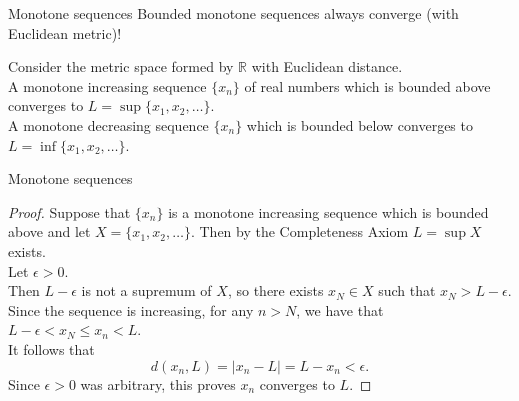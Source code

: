 \documentclass{beamer}
\begin{document}
\begin{frame}{Monotone sequences}
Bounded monotone sequences always converge (with Euclidean metric)!
\pause
\begin{thm}
\pause
Consider the metric space formed by $\mathbb{R}$ with Euclidean distance.\\
\pause
A monotone increasing sequence $\{x_n\}$ of real numbers which is bounded above converges to $L = \sup\{x_1,x_2,\dots\}$.\\
\pause
A monotone decreasing sequence $\{x_n\}$ which is bounded below converges to $L = \inf\{x_1,x_2,\dots\}$.
\end{thm}
\end{frame}

\begin{frame}{Monotone sequences}
\begin{proof}
\pause
Suppose that $\{x_n\}$ is a monotone increasing sequence which is bounded above and let $X = \{x_1,x_2,\dots\}$.
\pause
Then by the Completeness Axiom $L=\sup X$ exists.\\
\pause
Let $\epsilon > 0$.\\
\pause
Then $L-\epsilon$ is not a supremum of $X$, so there exists $x_N\in X$ such that $x_N > L-\epsilon$.\\
\pause
Since the sequence is increasing, for any $n >N$, we have that $L-\epsilon < x_N \leq x_n < L$.\\
\pause
It follows that
$$d(x_n,L) = |x_n-L| = L-x_n < \epsilon.$$
\pause
Since $\epsilon > 0$ was arbitrary, this proves $x_n$ converges to $L$.
\end{proof}
\end{frame}
\end{document}
